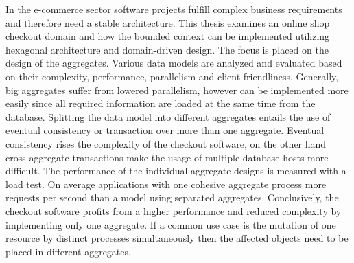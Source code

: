 {{{			In the e-commerce sector software projects fulfill complex business requirements and therefore need a stable architecture. This thesis examines an online shop checkout domain and how the bounded context can be implemented utilizing hexagonal architecture and domain-driven design. The focus is placed on the design of the aggregates. Various data models are analyzed and evaluated based on their complexity, performance, parallelism and client-friendliness. Generally, big aggregates suffer from lowered parallelism, however can be implemented more easily since all required information are loaded at the same time from the database. Splitting the data model into different aggregates entails the use of eventual consistency or transaction over more than one aggregate. Eventual consistency rises the complexity of the checkout software, on the other hand cross-aggregate transactions make the usage of multiple database hosts more difficult. The performance of the individual aggregate designs is measured with a load test. On average applications with one cohesive aggregate process more requests per second than a model using separated aggregates. Conclusively, the checkout software profits from a higher performance and reduced complexity by implementing only one aggregate. If a common use case is the mutation of one resource by distinct processes simultaneously then the affected objects need to be placed in different aggregates. 
			
			\par}
		\vfill
	}
	
	
 	\pagebreak

	\large
	
	{
		\vspace*{\fill}
		}}
